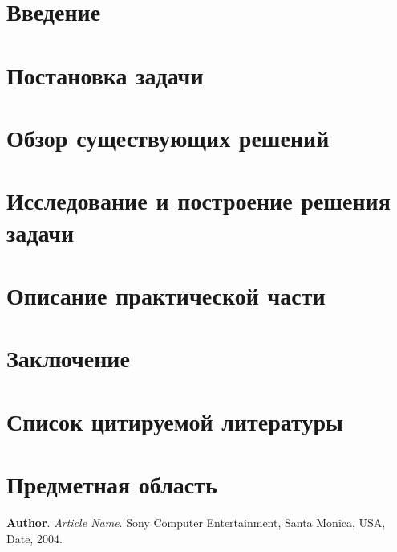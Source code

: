 \documentclass[11pt,a4paper]{extarticle}
\begin{document}
\newpage
\tableofcontents
\newpage

\section{Введение}

\section{Постановка задачи}

\section{Обзор существующих решений}

\section{Исследование и построение решения задачи}

\section{Описание практической части}

\section{Заключение}

\section{Список цитируемой литературы}

\section{Предметная область}

\begin{thebibliography}{00}

	\textbf{Author}.
	\emph{Article Name}.
	Sony Computer Entertainment, Santa Monica, USA,
	Date, 2004.


\end{thebibliography}
\end{document}
